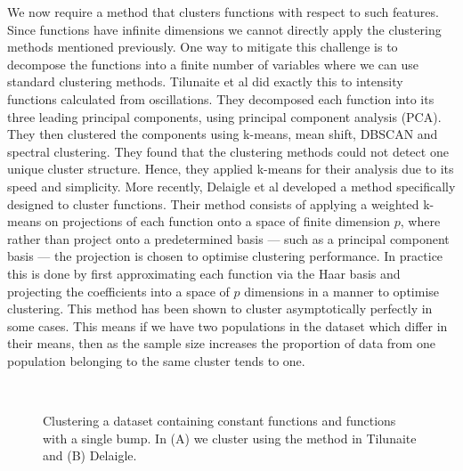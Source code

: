 \documentclass[../main.tex]{subfiles}
\begin{document}
We now require a method that clusters functions with respect to such features. 
Since functions have infinite dimensions we cannot directly apply the clustering methods mentioned previously. One way to mitigate this challenge is to decompose the functions into a finite number of variables where we can use standard clustering methods. Tilunaite et al \cite{Tilunaite_2017} did exactly this to intensity functions calculated from  oscillations. They decomposed each  function into its three leading principal components, using principal component analysis (PCA). They then clustered the components using k-means, mean shift, DBSCAN and spectral clustering. They found that the clustering methods could not detect one unique cluster structure. Hence, they applied k-means for their analysis due to its speed and simplicity. More recently, Delaigle et al \cite{Delaigle_2019} developed a method specifically designed to cluster functions. Their method consists of applying a weighted k-means on projections of each function onto a space of finite dimension $p$, where rather than project onto a predetermined basis ---  such as a principal component basis --- the projection is chosen to optimise clustering performance. In practice this is done by first approximating each function via the Haar basis and projecting the coefficients into a space of $p$ dimensions in a manner to optimise clustering. This method has been shown to cluster asymptotically perfectly in some cases. This means if we have two populations in the dataset which differ in their means, then as the sample size increases the proportion of data from one population belonging to the same cluster tends to one.  

     \begin{figure}[ht!]
   \hrulefill
   \begin{center} 
   \quad
      \\ 
    \end{center}     
    \caption{Clustering a dataset containing constant functions and functions with a single bump. In (A) we cluster using the method in Tilunaite and (B) Delaigle.}
    \label{fig:FitBad}
    \hrulefill
    \end{figure}
\end{document}
